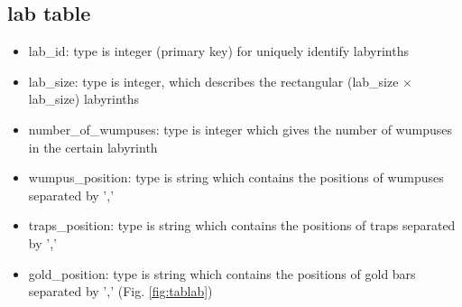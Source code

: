 \documentclass[a4paper,12pt]{article}
\begin{document}
%
%

\subsection{lab table}

\begin{itemize}
	\item lab\_id: type is integer (primary key) for uniquely identify labyrinths
	\item lab\_size: type is integer, which describes the rectangular (lab\_size $\times$ lab\_size) labyrinths
	\item number\_of\_wumpuses: type is integer which gives the number of wumpuses in the certain labyrinth
	\item wumpus\_position: type is string which contains the positions of wumpuses separated by ','
	\item traps\_position: type is string which contains the positions of traps separated by ','
	\item gold\_position: type is string which contains the positions of gold bars separated by ','	(Fig. \ref{fig:tablab})
\end{itemize}
\end{document}
